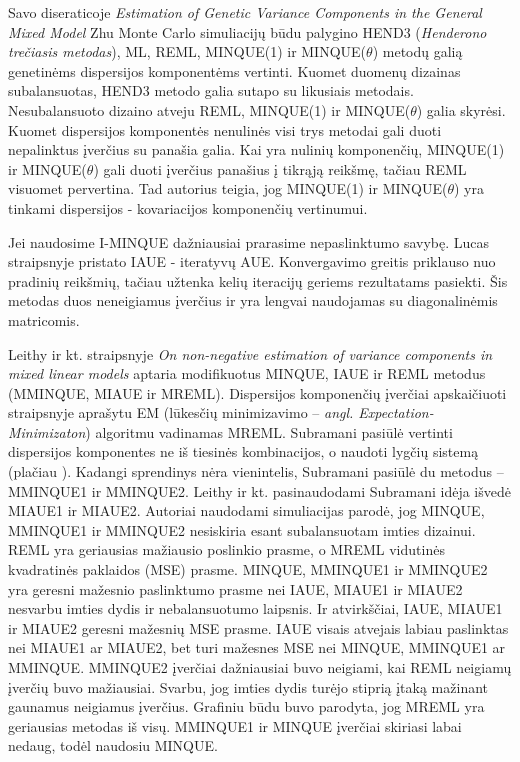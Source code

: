 \documentclass[11pt,a4paper]{article}
\begin{document}
\indent Savo diseraticoje \textit{Estimation of Genetic Variance Components in the General Mixed Model}\cite{zhu} Zhu Monte Carlo simuliacijų būdu palygino HEND3 (\textit{Henderono trečiasis metodas}), ML, REML, MINQUE(1) ir MINQUE($\theta$) metodų galią genetinėms dispersijos komponentėms vertinti. Kuomet duomenų dizainas subalansuotas, HEND3 metodo galia sutapo su likusiais metodais. Nesubalansuoto dizaino atveju REML, MINQUE(1) ir MINQUE($\theta$) galia skyrėsi. Kuomet dispersijos komponentės nenulinės visi trys metodai gali duoti nepalinktus įverčius su panašia galia. Kai yra nulinių komponenčių, MINQUE(1) ir MINQUE($\theta$) gali duoti įverčius panašius į tikrąją reikšmę, tačiau REML visuomet pervertina. Tad autorius teigia, jog MINQUE(1) ir MINQUE($\theta$) yra tinkami dispersijos - kovariacijos komponenčių vertinumui.

\indent Jei naudosime I-MINQUE dažniausiai prarasime nepaslinktumo savybę. Lucas straipsnyje \cite{IAUE} pristato IAUE - iteratyvų AUE. Konvergavimo greitis priklauso nuo pradinių reikšmių, tačiau užtenka kelių iteracijų geriems rezultatams pasiekti. Šis metodas duos neneigiamus įverčius ir yra lengvai naudojamas su diagonalinėmis matricomis.

\indent Leithy ir kt. straipsnyje \textit{On non-negative estimation of variance components in mixed linear models} \cite{MMINQUE} aptaria  modifikuotus MINQUE, IAUE ir REML metodus (MMINQUE, MIAUE ir MREML). Dispersijos komponenčių įverčiai apskaičiuoti straipsnyje aprašytu EM (lūkesčių minimizavimo --  \textit{angl. Expectation-Minimizaton}) algoritmu vadinamas MREML. Subramani \cite{MMIVQUE} pasiūlė vertinti dispersijos komponentes ne iš tiesinės kombinacijos, o naudoti lygčių sistemą (plačiau \cite{MMINQUE}). Kadangi sprendinys nėra vienintelis, Subramani pasiūlė du metodus -- MMINQUE1 ir MMINQUE2. Leithy ir kt. pasinaudodami Subramani idėja išvedė MIAUE1 ir MIAUE2. Autoriai naudodami simuliacijas parodė, jog MINQUE, MMINQUE1 ir MMINQUE2 nesiskiria esant subalansuotam imties dizainui. REML yra geriausias mažiausio poslinkio prasme, o MREML vidutinės kvadratinės paklaidos (MSE) prasme. MINQUE, MMINQUE1 ir MMINQUE2 yra geresni mažesnio paslinktumo prasme nei IAUE, MIAUE1 ir MIAUE2 nesvarbu imties dydis ir nebalansuotumo laipsnis. Ir atvirkščiai, IAUE, MIAUE1 ir MIAUE2 geresni mažesnių MSE prasme. IAUE visais atvejais labiau paslinktas nei MIAUE1 ar MIAUE2, bet turi mažesnes MSE nei MINQUE, MMINQUE1 ar MMINQUE. MMINQUE2 įverčiai dažniausiai buvo neigiami, kai REML neigiamų įverčių buvo mažiausiai. Svarbu, jog imties dydis turėjo stiprią įtaką mažinant gaunamus neigiamus įverčius. Grafiniu būdu buvo parodyta, jog MREML yra geriausias metodas iš visų. MMINQUE1 ir MINQUE įverčiai skiriasi labai nedaug, todėl naudosiu MINQUE.
\end{document}
